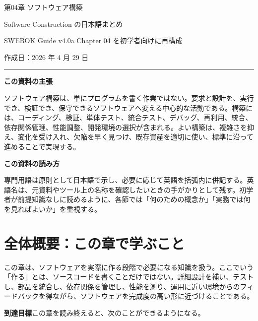 \documentclass[a4paper,11pt,ja=standard,xelatex]{bxjsarticle}
\begin{document}
\thispagestyle{empty}

\begin{center}
  {\LARGE 第04章 ソフトウェア構築}\par
  \vspace{0.8em}
  {\large Software Construction の日本語まとめ}\par
  \vspace{0.6em}
  SWEBOK Guide v4.0a Chapter 04 を初学者向けに再構成\par
  \vspace{1.2em}
  作成日：2026 年 4 月 29 日
\end{center}

\vspace{1em}
\hrule
\vspace{0.8em}

\noindent\textbf{この資料の主張}

ソフトウェア構築は、単にプログラムを書く作業ではない。要求と設計を、実行でき、検証でき、保守できるソフトウェアへ変える中心的な活動である。構築には、コーディング、検証、単体テスト、統合テスト、デバッグ、再利用、統合、依存関係管理、性能調整、開発環境の選択が含まれる。よい構築は、複雑さを抑え、変化を受け入れ、欠陥を早く見つけ、既存資産を適切に使い、標準に沿って進めることで実現する。

\begin{plainbox}
\textbf{この資料の読み方}

専門用語は原則として日本語で示し、必要に応じて英語を括弧内に併記する。英語名は、元資料やツール上の名称を確認したいときの手がかりとして残す。初学者が前提知識なしに読めるように、各節では「何のための概念か」「実務では何を見ればよいか」を重視する。
\end{plainbox}

\vspace{1em}
\tableofcontents

\newpage

\section*{全体概要：この章で学ぶこと}

この章は、ソフトウェアを実際に作る段階で必要になる知識を扱う。ここでいう「作る」とは、ソースコードを書くことだけではない。詳細設計を補い、テストし、部品を統合し、依存関係を管理し、性能を測り、運用に近い環境からのフィードバックを得ながら、ソフトウェアを完成度の高い形に近づけることである。

\noindent\textbf{到達目標}\quad この章を読み終えると、次のことができるようになる。
\end{document}
